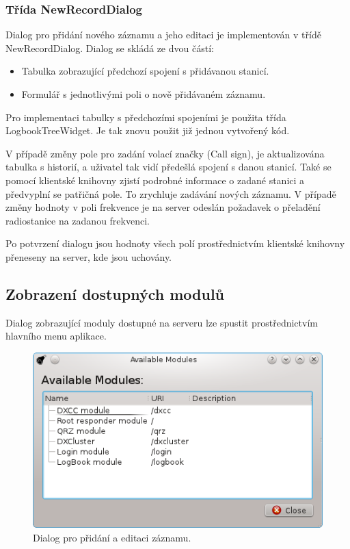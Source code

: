 \subsubsection{Třída NewRecordDialog}

Dialog pro přidání nového záznamu a jeho editaci je implementován v třídě NewRecordDialog. Dialog se skládá ze dvou částí:

\begin{itemize}
\item Tabulka zobrazující předchozí spojení s přidávanou stanicí.
\item Formulář s jednotlivými poli o nově přidávaném záznamu.
\end{itemize}

Pro implementaci tabulky s předchozími spojeními je použita třída
LogbookTreeWidget. Je tak znovu použit již jednou vytvořený
kód.

V případě změny pole pro zadání volací značky (Call sign), je aktualizována tabulka s historií, a uživatel tak vidí předešlá 
spojení s danou stanicí. Také se pomocí klientské knihovny zjistí podrobné informace o zadané stanici a předvyplní se patřičná
pole. To zrychluje zadávání nových záznamu. V případě změny hodnoty v poli frekvence je na server odeslán požadavek o přeladění
radiostanice na zadanou frekvenci.

Po potvrzení dialogu jsou hodnoty všech polí prostřednictvím klientské knihovny přeneseny na server, kde jsou uchovány.

\subsection{Zobrazení dostupných modulů}

Dialog zobrazující moduly dostupné na serveru lze spustit prostřednictvím hlavního menu aplikace.

\begin{figure}[h]
\centering
\includegraphics[trim=0cm 0cm 0cm 0cm, scale=1]{fig/ham6}
\caption{Dialog pro přidání a editaci záznamu.}
\label{fig:FigureExample}
\end{figure}

